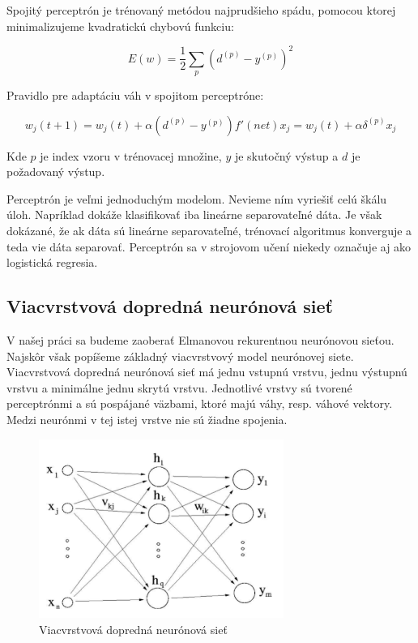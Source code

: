 Spojitý perceptrón je trénovaný metódou najprudšieho spádu, pomocou
ktorej minimalizujeme kvadratickú chybovú funkciu:

\begin{equation}
	E(w) = \frac{1}{2}\sum_{p}\left(d^{(p)} - y^{(p)}\right)^{2} 
\end{equation}

Pravidlo pre adaptáciu váh v spojitom perceptróne:

\begin{equation}
	w_{j}(t+1) = w_{j}(t) + \alpha (d^{(p)} - y^{(p)})f'(net)x_{j} = w_{j}(t) + \alpha \delta^{(p)}x_{j}
\end{equation}

Kde $p$ je index vzoru v trénovacej množine, $y$ je skutočný výstup a $d$ je požadovaný výstup.


Perceptrón je veľmi jednoduchým modelom. 
Nevieme ním vyriešiť celú škálu úloh. Napríklad dokáže klasifikovať 
iba lineárne separovateľné dáta. Je však dokázané, že ak dáta sú lineárne separovateľné, trénovací algoritmus
konverguje a teda vie dáta separovať.
Perceptrón sa v strojovom učení niekedy označuje aj ako logistická regresia.

\subsection{Viacvrstvová dopredná neurónová sieť}
V našej práci sa budeme zaoberať Elmanovou rekurentnou neurónovou sieťou. \cite{Elman90findingstructure} Najskôr však popíšeme základný viacvrstvový model
neurónovej siete. 
Viacvrstvová dopredná neurónová sieť má jednu vstupnú vrstvu, jednu výstupnú vrstvu a minimálne jednu skrytú vrstvu. 
Jednotlivé vrstvy sú tvorené perceptrónmi a sú pospájané väzbami, ktoré majú váhy, resp. váhové vektory. 
Medzi neurónmi v tej istej vrstve nie sú žiadne spojenia.

\begin{figure}[H]
	\centering
	\includegraphics[width=8cm]{assets/mlp}
	\caption{Viacvrstvová dopredná neurónová sieť}
\end{figure}

